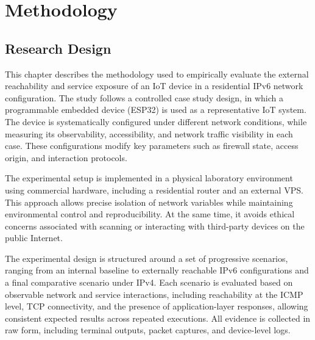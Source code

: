 \chapter{Methodology}\label{ch:methodology} 

\section{Research Design}\label{sec:research-design} 
This chapter describes the methodology used to empirically evaluate the external reachability and service exposure of an IoT device in a residential IPv6 network configuration. The study follows a controlled case study design, in which a programmable embedded device (ESP32) is used as a representative IoT system. The device is systematically configured under different network conditions, while measuring its observability, accessibility, and network traffic visibility in each case. These configurations modify key parameters such as firewall state, access origin, and interaction protocols.

The experimental setup is implemented in a physical laboratory environment using commercial hardware, including a residential router and an external VPS. This approach allows precise isolation of network variables while maintaining environmental control and reproducibility. At the same time, it avoids ethical concerns associated with scanning or interacting with third-party devices on the public Internet. 

The experimental design is structured around a set of progressive scenarios, ranging from an internal baseline to externally reachable IPv6 configurations and a final comparative scenario under IPv4. Each scenario is evaluated based on observable network and service interactions, including reachability at the ICMP level, TCP connectivity, and the presence of application-layer responses, allowing consistent expected results across repeated executions. All evidence is collected in raw form, including terminal outputs, packet captures, and device-level logs. 

